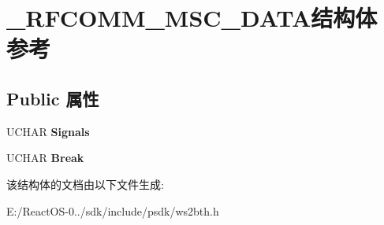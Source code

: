 \hypertarget{struct___r_f_c_o_m_m___m_s_c___d_a_t_a}{}\section{\+\_\+\+R\+F\+C\+O\+M\+M\+\_\+\+M\+S\+C\+\_\+\+D\+A\+T\+A结构体 参考}
\label{struct___r_f_c_o_m_m___m_s_c___d_a_t_a}
\subsection*{Public 属性}
\begin{DoxyCompactItemize}
\item 
\mbox{\label{struct___r_f_c_o_m_m___m_s_c___d_a_t_a_ade3856935f851882a4a0da350a8c279f}} 
U\+C\+H\+AR {\bfseries Signals}
\item 
\mbox{\label{struct___r_f_c_o_m_m___m_s_c___d_a_t_a_aeb46b2383c441ac8ef350343dc5066a8}} 
U\+C\+H\+AR {\bfseries Break}
\end{DoxyCompactItemize}


该结构体的文档由以下文件生成\+:\begin{DoxyCompactItemize}
\item 
E\+:/\+React\+O\+S-\/0../sdk/include/psdk/ws2bth.\+h\end{DoxyCompactItemize}
